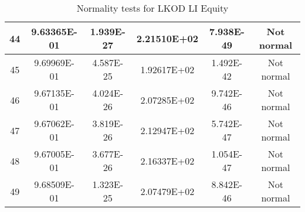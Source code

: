 \begin{table}[h]
\begin{tabular}{|c|c|c|c|c|c|}
		44 & 9.63365E-01 & 1.939E-27 & 2.21510E+02 & 7.938E-49 & Not normal\\\hline
		45 & 9.69969E-01 & 4.587E-25 & 1.92617E+02 & 1.492E-42 & Not normal\\\hline
		46 & 9.67135E-01 & 4.024E-26 & 2.07285E+02 & 9.742E-46 & Not normal\\\hline
		47 & 9.67062E-01 & 3.819E-26 & 2.12947E+02 & 5.742E-47 & Not normal\\\hline
		48 & 9.67005E-01 & 3.677E-26 & 2.16337E+02 & 1.054E-47 & Not normal\\\hline
		49 & 9.68509E-01 & 1.323E-25 & 2.07479E+02 & 8.842E-46 & Not normal\\\hline
	\end{tabular}
	\caption{Normality tests for LKOD LI Equity}
	\label{tab:normality_tests_LKOD_LI}
\end{table}
